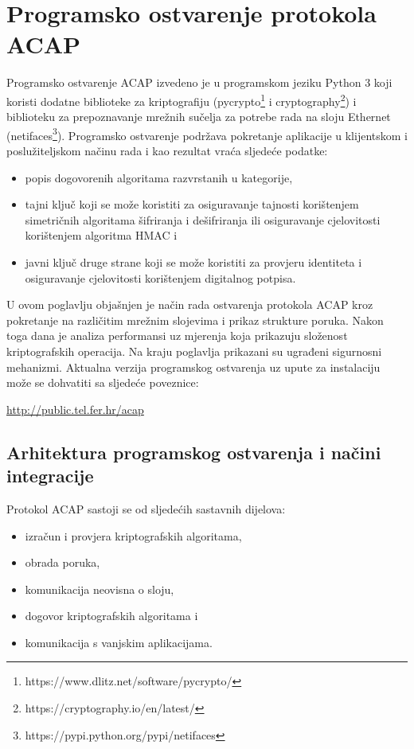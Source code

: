 \chapter{Programsko ostvarenje protokola ACAP}
\label{ch:impl}

Programsko ostvarenje ACAP izvedeno je u programskom jeziku Python 3 koji
koristi dodatne biblioteke za kriptografiju
(pycrypto\footnote{https://www.dlitz.net/software/pycrypto/} i
cryptography\footnote{https://cryptography.io/en/latest/}) i biblioteku za
prepoznavanje mrežnih sučelja za
potrebe rada na sloju Ethernet
(netifaces\footnote{https://pypi.python.org/pypi/netifaces}). Programsko
ostvarenje podržava
pokretanje aplikacije u klijentskom i poslužiteljskom načinu rada i kao rezultat
vraća sljedeće podatke:
\begin{itemize}
\item popis dogovorenih algoritama razvrstanih u kategorije,
\item tajni ključ koji se može koristiti za osiguravanje tajnosti korištenjem
simetričnih algoritama šifriranja i dešifriranja ili osiguravanje
cjelovitosti korištenjem algoritma HMAC i
\item javni ključ druge strane koji se može koristiti za provjeru identiteta i
osiguravanje cjelovitosti korištenjem digitalnog potpisa.
\end{itemize}

U ovom poglavlju objašnjen je način rada ostvarenja protokola
ACAP kroz pokretanje na različitim mrežnim slojevima i prikaz strukture poruka.
Nakon toga dana je analiza performansi uz mjerenja koja prikazuju složenost
kriptografskih operacija. Na kraju poglavlja prikazani su ugrađeni sigurnosni
mehanizmi. Aktualna verzija programskog ostvarenja uz upute za instalaciju može se
dohvatiti sa sljedeće poveznice:
\begin{center}
    \url{http://public.tel.fer.hr/acap}
\end{center}

\section{Arhitektura programskog ostvarenja i načini integracije}
Protokol ACAP sastoji se od sljedećih sastavnih dijelova:
\begin{itemize}
    \item izračun i provjera kriptografskih algoritama,
    \item obrada poruka,
    \item komunikacija neovisna o sloju,
    \item dogovor kriptografskih algoritama i
    \item komunikacija s vanjskim aplikacijama.
\end{itemize}

